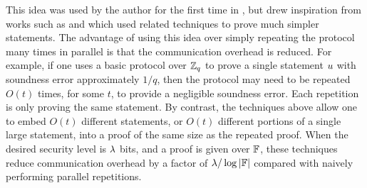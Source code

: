 This idea was used by the author for the first time in \cite{BaumBCPGL18}, but drew inspiration from works such as \cite{CramerDK14} and \cite{CramerDP12} which used related techniques to prove much simpler statements. The advantage of using this idea over simply repeating the protocol many times in parallel is that the communication overhead is reduced. For example, if one uses a basic protocol over $\mathbb{Z}_q$ to prove a single statement $u$ with soundness error approximately $1/q$, then the protocol may need to be repeated $O(t)$ times, for some $t$, to provide a negligible soundness error. Each repetition is only proving the same statement. By contrast, the techniques above allow one to embed $O(t)$ different statements, or $O(t)$ different portions of a single large statement, into a proof of the same size as the repeated proof. When the desired security level is $\lambda$ bits, and a proof is given over $\mathbb{F}$, these techniques reduce communication overhead by a factor of $\lambda / \log|\mathbb{F}|$ compared with naively performing parallel repetitions.